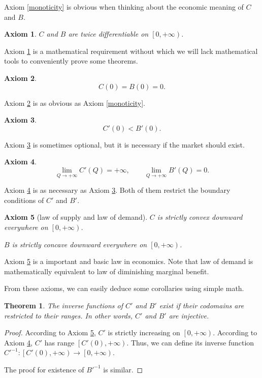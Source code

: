 \documentclass{article}
\newtheorem{axiom}{Axiom}[subsection]
\newtheorem{theorem}{Theorem}[subsection]
\begin{document}
Axiom \ref{monoticity} is obvious when thinking about the economic meaning of $C$ and $B$.

\begin{axiom}
\label{smoothness}
$C$ and $B$ are twice differentiable on $\left[0,+\infty\right)$.
\end{axiom}

Axiom \ref{smoothness} is a mathematical requirement
without which we will lack mathematical tools to conveniently prove some theorems.

\begin{axiom}
\label{initial cost and benefit}
$$C\left(0\right)=B\left(0\right)=0.$$
\end{axiom}

Axiom \ref{initial cost and benefit} is as obvious as Axiom \ref{monoticity}.

\begin{axiom}
\label{initial supply and demand}
$$C'\left(0\right)<B'\left(0\right).$$
\end{axiom}

Axiom \ref{initial supply and demand} is sometimes optional,
but it is necessary if the market should exist.

\begin{axiom}
\label{inf}
$$\lim_{Q\to+\infty}C'\left(Q\right)=+\infty,
\qquad\lim_{Q\to+\infty}B'\left(Q\right)=0.$$
\end{axiom}

Axiom \ref{inf} is as necessary as Axiom \ref{initial supply and demand}.
Both of them restrict the boundary conditions of $C'$ and $B'$.

\begin{axiom}[law of supply and law of demand]
\label{law of supply and demand}
$C$ is strictly convex downward everywhere on $\left[0,+\infty\right)$.

$B$ is strictly concave downward everywhere on $\left[0,+\infty\right)$.
\end{axiom}

Axiom \ref{law of supply and demand} is a important and basic law in economics.
Note that law of demand is mathematically equivalent to law of diminishing marginal benefit.

From these axioms, we can easily deduce some corollaries using simple math.

\begin{theorem}
\label{inverse supply and demand}
The inverse functions of $C'$ and $B'$ exist if their codomains are restricted to their ranges.
In other words, $C'$ and $B'$ are injective.
\end{theorem}
\begin{proof}
According to Axiom \ref{law of supply and demand}, $C'$ is strictly increasing on $\left[0,+\infty\right)$.
According to Axiom \ref{inf}, $C'$ has range $\left[C'\left(0\right),+\infty\right)$.
Thus, we can define its inverse function $C'^{-1}:\left[C'\left(0\right),+\infty\right)\to\left[0,+\infty\right)$.

The proof for existence of $B'^{-1}$ is similar.
\end{proof}
\end{document}
